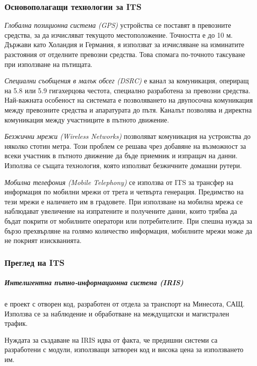 	  \subsubsection{Основополагащи технологии за \ac{ITS}}
	  	
	  	\emph{Глобална позиционна система (GPS)} устройства се поставят в превозните средства,
	  	за да изчисляват текущото местоположение. Точността е до 10 м. Държави като Холандия и Германия,
	  	я използват за изчисляване на изминатите разстояния от отделните превозни средства. Това
	  	спомага по-точното таксуване при използване на пътищата.
	  	
			\emph{Специални съобщения в малък обсег (DSRC)}	е канал за комуникация, опериращ на 5.8 или 5.9 гигахерцова честота,
			специално разработена за превозни средства. Най-важната особеност на системата е позволяването на двупосочна комуникация
			между превозните средства и апаратурата до пътя. Каналът позволява и директна комуникация между участниците в пътното движение.
			
			\emph{Безжични мрежи (Wireless Networks)} позволяват комуникация на устроиства до няколко стотин метра. Този проблем
			се решава чрез добавяне на възможност за всеки участник в пътното движение да бъде приемник и изпращач на данни. Използва се същата
			технология, която използват безжичните домашни рутери. 
	  
	  	\emph{Мобилна телефония (Mobile Telephony)} се използва от \ac{ITS} за трансфер на информация по
	  	мобилни мрежи от трета и четвърта генерация. Предимство на тези мрежи е наличието им в градовете.
	  	При използване на мобилна мрежа се наблюдават увеличение на изпратените и получените данни,
	  	които трябва да бъдат покрити от мобилните оператори или потребителите. При спешна нужда
	  	за бързо прехвърляне на голямо количество информация, мобилните мрежи може да не покрият изискванията.	  		  	
	    
	  \subsubsection{Преглед на \ac{ITS}}
	  	  	
	  	\subparagraph{\emph{Интелигентна пътно-информационна система (IRIS)}} е проект с отворен код, 
	  	разработен от отдела за транспорт на Минесота, САЩ. 
	  	Използва се за наблюдение и обработване на междущатски и магистрален трафик.	  	
	  	
	  	Нуждата за създаване на IRIS идва от факта, че предишни системи са разработени
	  	с модули, използващи затворен код и висока цена за използването им. \cite{Darter}
	  	
